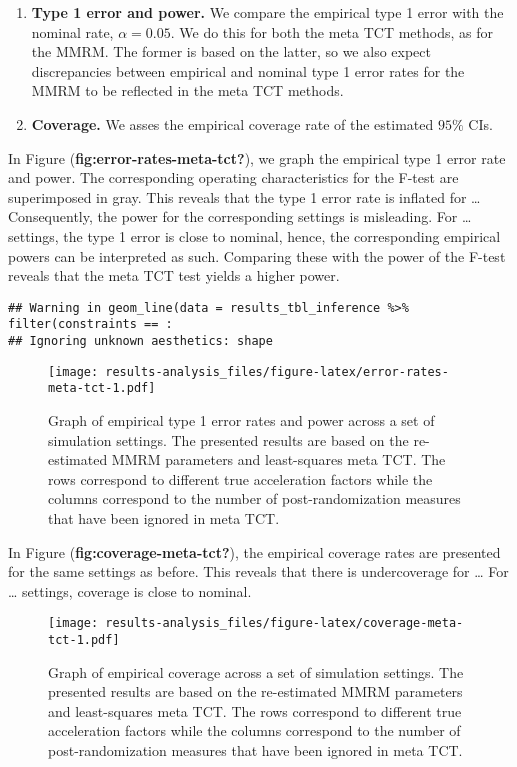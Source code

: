 \documentclass[
]{article}
\providecommand{\tightlist}{%
  \setlength{\itemsep}{0pt}\setlength{\parskip}{0pt}}
\begin{document}
\begin{enumerate}
\def\labelenumi{\arabic{enumi}.}
\tightlist
\item
  \textbf{Type 1 error and power.} We compare the empirical type 1 error with the
  nominal rate, \(\alpha = 0.05\). We do this for both the meta TCT methods, as for
  the MMRM. The former is based on the latter, so we also expect discrepancies
  between empirical and nominal type 1 error rates for the MMRM to be reflected in
  the meta TCT methods.
\item
  \textbf{Coverage.} We asses the empirical coverage rate of the estimated \(95\%\)
  CIs.
\end{enumerate}

In Figure (\textbf{fig:error-rates-meta-tct?}), we graph the empirical type 1 error rate and
power. The corresponding operating characteristics for the F-test are superimposed
in gray.
This reveals that the type 1 error rate is inflated for \ldots{} Consequently, the power
for the corresponding settings is misleading.
For \ldots{} settings, the type 1 error is close to nominal, hence, the corresponding
empirical powers can be interpreted as such. Comparing these with the power of the
F-test reveals that the meta TCT test yields a higher power.

\begin{verbatim}
## Warning in geom_line(data = results_tbl_inference %>% filter(constraints == :
## Ignoring unknown aesthetics: shape
\end{verbatim}

\begin{figure}
\centering
\texttt{[image: results-analysis\_files/figure-latex/error-rates-meta-tct-1.pdf]}
\caption{\label{fig:error-rates-meta-tct}Graph of empirical type 1 error rates and power across a set of simulation settings. The presented results are based on the re-estimated MMRM parameters and least-squares meta TCT. The rows correspond to different true acceleration factors while the columns correspond to the number of post-randomization measures that have been ignored in meta TCT.}
\end{figure}

In Figure (\textbf{fig:coverage-meta-tct?}), the empirical coverage rates are presented for
the same settings as before.
This reveals that there is undercoverage for \ldots{}
For \ldots{} settings, coverage is close to nominal.

\begin{figure}
\centering
\texttt{[image: results-analysis\_files/figure-latex/coverage-meta-tct-1.pdf]}
\caption{\label{fig:coverage-meta-tct}Graph of empirical coverage across a set of simulation settings. The presented results are based on the re-estimated MMRM parameters and least-squares meta TCT. The rows correspond to different true acceleration factors while the columns correspond to the number of post-randomization measures that have been ignored in meta TCT.}
\end{figure}
\end{document}
